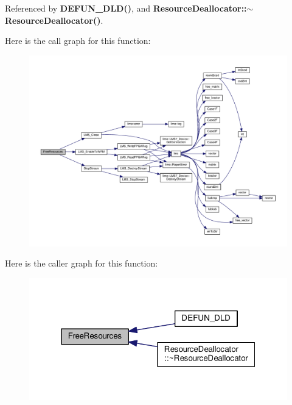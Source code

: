 Referenced by {\bf D\+E\+F\+U\+N\+\_\+\+D\+L\+D()}, and {\bf Resource\+Deallocator\+::$\sim$\+Resource\+Deallocator()}.



Here is the call graph for this function\+:
\nopagebreak
\begin{figure}[H]
\begin{center}
\leavevmode
\includegraphics[width=350pt]{db/d92/LimeSuite_8cc_a600901608dd432caf717ac1d4f09c6aa_cgraph}
\end{center}
\end{figure}




Here is the caller graph for this function\+:
\nopagebreak
\begin{figure}[H]
\begin{center}
\leavevmode
\includegraphics[width=319pt]{db/d92/LimeSuite_8cc_a600901608dd432caf717ac1d4f09c6aa_icgraph}
\end{center}
\end{figure}


